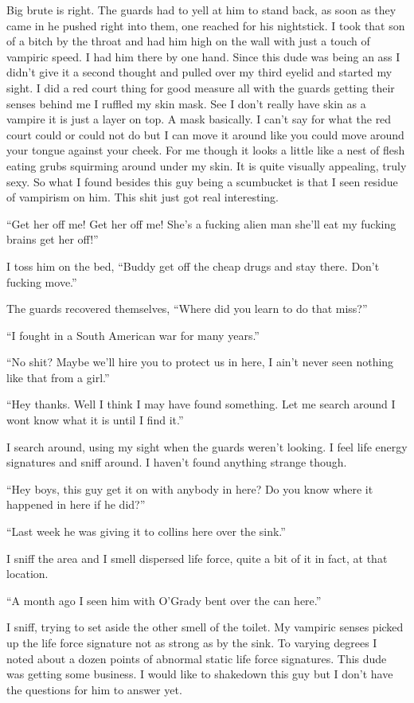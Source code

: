 Big brute is right. The guards had to yell at him to stand back, as soon as they came in he pushed right into them, one reached for his nightstick. I took that son of a bitch by the throat and had him high on the wall with just a touch of vampiric speed. I had him  there by one hand. Since this dude was being an ass I didn't give it a second thought and pulled over my third eyelid and started my sight. I did a red court thing for good measure all with the guards getting their senses behind me I ruffled my skin mask. See I don't really have skin as a vampire it is just a layer on top. A mask basically. I can't say for what the red court could or could not do but I can move it around like you could move around your tongue against your cheek. For me though it looks a little like a nest of flesh eating grubs squirming around under my skin. It is quite visually appealing, truly sexy. So what I found besides this guy being a scumbucket is that I seen residue of vampirism on him. This shit just got real interesting.

``Get her off me! Get her off me! She's a fucking alien man she'll eat my fucking brains get her off!''

I toss him on the bed, ``Buddy get off the cheap drugs and stay there. Don't fucking move.''

The guards recovered themselves, ``Where did you learn to do that miss?''

``I fought in a South American war for many years.''

``No shit? Maybe we'll hire you to protect us in here, I ain't never seen nothing like that from a girl.''

``Hey thanks. Well I think I may have found something. Let me search around I wont know what it is until I find it.''

I search around, using my sight when the guards weren't looking. I feel life energy signatures and sniff around. I haven't found anything strange though.

``Hey boys, this guy get it on with anybody in here? Do you know where it happened in here if he did?''

``Last week he was giving it to collins here over the sink.''

I sniff the area and I smell dispersed life force, quite a bit of it in fact, at that location.

``A month ago I seen him with O'Grady bent over the can here.''

I sniff, trying to set aside the other smell of the toilet. My vampiric senses picked up the life force signature not as strong as by the sink. To varying degrees I noted about a dozen points of abnormal static life force signatures. This dude was getting some business. I would like to shakedown this guy but I don't have the questions for him to answer yet.

